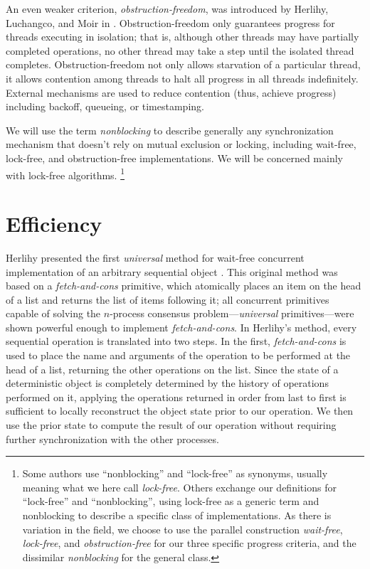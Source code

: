 An even weaker criterion, \emph{obstruction-freedom}, was introduced
by Herlihy, Luchangco, and Moir in \cite{HerlihyLuMo03}.
Obstruction-freedom only guarantees progress for threads executing in
isolation; that is, although other threads may have partially
completed operations, no other thread may take a step until the
isolated thread completes.  Obstruction-freedom not only allows
starvation of a particular thread, it allows contention among threads
to halt all progress in all threads
indefinitely.  External mechanisms are used to reduce contention
(thus, achieve progress) including backoff, queueing, or timestamping.

We will use the term \emph{nonblocking} to describe
generally any synchronization mechanism that doesn't rely on mutual
exclusion or locking, including wait-free, lock-free,
and obstruction-free implementations.
We will be concerned mainly with lock-free algorithms.%
\footnote{Some authors use ``nonblocking'' and
  ``lock-free'' as synonyms, usually meaning what we here call
  \emph{lock-free}.  Others exchange our definitions for ``lock-free''
  and ``nonblocking'', using lock-free as a generic term and nonblocking
  to describe a specific class of implementations.  As there is
  variation in the field, we choose to use the parallel construction
  \emph{wait-free}, \emph{lock-free}, and \emph{obstruction-free} for
  our three specific progress criteria, and the dissimilar
  \emph{nonblocking} for the general class.}

\section{Efficiency}\label{sec:efficiency}
Herlihy presented the first \emph{universal} method for wait-free
concurrent implementation of an arbitrary sequential object
\cite{Herlihy88,Herlihy91}.  This original method was based on
a \emph{fetch-and-cons} primitive, which atomically places
an item on the head of a list and returns the list of items following
it; all concurrent primitives capable of solving the
$n$-process consensus problem---\emph{universal} primitives---were
shown powerful enough to implement \emph{fetch-and-cons}.
In Herlihy's method, 
every sequential operation is translated into two steps.  In the first,
\emph{fetch-and-cons} is used to place the name and arguments of the
operation to be performed
at the head of a list, returning the other operations on the list.
Since the state
of a deterministic object is completely determined by the history of
operations performed on it, applying the operations returned
in order from last to first is sufficient to locally reconstruct the
object state 
prior to our operation.
We then use the prior state to compute the result of our operation
without requiring further synchronization with the other processes.

